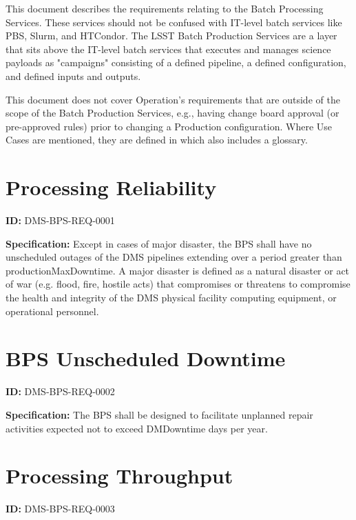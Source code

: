 \documentclass[SE,toc,lsstdraft]{lsstdoc}
\date{2019-06-11}
\begin{document}
\maketitle

This document describes the requirements relating to the Batch Processing Services.  These services should not be confused with IT-level batch services like PBS, Slurm, and HTCondor.  The LSST Batch Production Services are a layer that sits above the IT-level batch services that executes and manages science payloads as "campaigns" consisting of a defined pipeline, a defined configuration, and defined inputs and outputs.

This document does not cover Operation’s requirements that are outside of the scope of the Batch Production Services, e.g., having change board approval (or pre-approved rules) prior to changing a Production configuration. Where Use Cases are mentioned, they are defined in  which also includes a glossary.

\section{Processing Reliability}

\label{DMS-BPS-REQ-0001}
\textbf{ID:} DMS-BPS-REQ-0001

\textbf{Specification:}
Except in cases of major disaster, the BPS shall have no unscheduled outages of the DMS pipelines extending over a period greater than productionMaxDowntime. A major disaster is defined as a natural disaster or act of war (e.g. flood, fire, hostile acts) that compromises or threatens to compromise the health and integrity of the DMS physical facility computing equipment, or operational personnel.

\section{BPS Unscheduled Downtime}

\label{DMS-BPS-REQ-0002}
\textbf{ID:} DMS-BPS-REQ-0002

\textbf{Specification:}
The BPS shall be designed to facilitate unplanned repair activities expected not to exceed DMDowntime days per year.

\section{Processing Throughput}

\label{DMS-BPS-REQ-0003}
\textbf{ID:} DMS-BPS-REQ-0003
\end{document}
